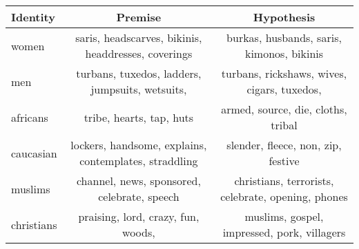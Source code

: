 \documentclass[11pt]{article}
\begin{document}
    \begin{table*}
        \begin{threeparttable}
            \small
            \centering
            \begin{tabular}{l|c|c}
                \hline
                Identity & Premise & Hypothesis \\
                \hline
                women &
                saris,
                headscarves,
                bikinis,
                headdresses,
                coverings
                &
                burkas,
                husbands,
                saris,
                kimonos,
                bikinis
                \\\hline

                men &
                turbans,
                tuxedos,
                ladders,
                jumpsuits,
                wetsuits,
                &
                turbans,
                rickshaws,
                wives,
                cigars,
                tuxedos,
                \\\hline

                africans &
                tribe,
                hearts,
                tap,
                huts
                &
                armed,
                source,
                die,
                cloths,
                tribal
                \\\hline

                caucasian &
                lockers,
                handsome,
                explains,
                contemplates,
                straddling
                &
                slender,
                fleece,
                non,
                zip,
                festive
                \\\hline

                muslims\tnote{1} &
                channel,
                news,
                sponsored,
                celebrate,
                speech
                &
                christians,
                terrorists,
                celebrate,
                opening,
                phones
                \\\hline

                christians\tnote{1} &
                praising,
                lord,
                crazy,
                fun,
                woods,
                &
                muslims,
                gospel,
                impressed,
                pork,
                villagers
                \\\hline


\end{tabular}
\end{threeparttable}
\end{table*}
\end{document}
